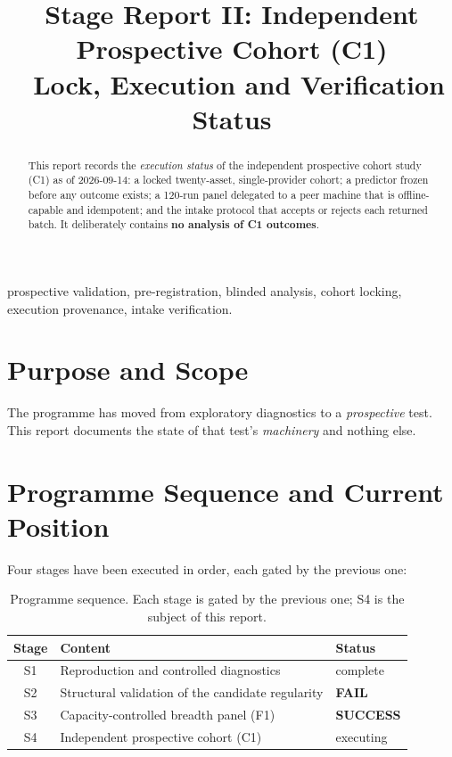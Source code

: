 \documentclass[conference]{IEEEtran}
\begin{document}
\title{Stage Report II: Independent Prospective Cohort (C1)\\\ Lock, Execution and Verification Status}

\author{
}

\maketitle

\begin{abstract}
This report records the \emph{execution status} of the independent prospective cohort study (C1)
as of 2026-09-14: a locked twenty-asset, single-provider cohort; a predictor frozen before any
outcome exists; a 120-run panel delegated to a peer machine that is offline-capable and idempotent;
and the intake protocol that accepts or rejects each returned batch. It deliberately contains
\textbf{no analysis of C1 outcomes}.
\end{abstract}

\begin{IEEEkeywords}
prospective validation, pre-registration, blinded analysis, cohort locking, execution provenance,
intake verification.
\end{IEEEkeywords}

\section{Purpose and Scope}

The programme has moved from exploratory diagnostics to a \emph{prospective} test. This report
documents the state of that test's \emph{machinery} and nothing else.

\section{Programme Sequence and Current Position}
\label{sec:seq}

Four stages have been executed in order, each gated by the previous one:

\begin{table}[!t]
\centering
\footnotesize
\begin{tabular}{@{}cll@{}}
\toprule
Stage & Content & Status \\
\midrule
S1 & Reproduction and controlled diagnostics & complete \\
S2 & Structural validation of the candidate regularity & \textbf{FAIL} \\
S3 & Capacity-controlled breadth panel (F1) & \textbf{SUCCESS} \\
S4 & Independent prospective cohort (C1) & executing \\
\bottomrule
\end{tabular}
\caption{Programme sequence. Each stage is gated by the previous one; S4 is the subject of this
report.}
\label{tab:seq}
\end{table}
\end{document}
